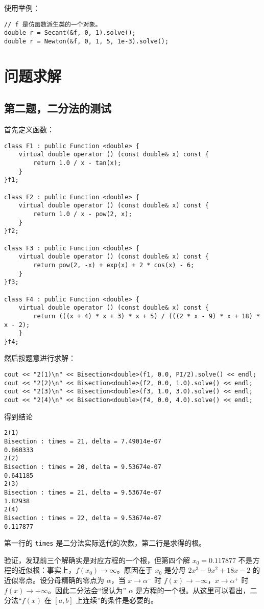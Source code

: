 \documentclass{ctexart}
\begin{document}
使用举例：
\begin{verbatim}
// f 是仿函数派生类的一个对象。
double r = Secant(&f, 0, 1).solve();
double r = Newton(&f, 0, 1, 5, 1e-3).solve();
\end{verbatim}

\section{问题求解}

\subsection{第二题，二分法的测试}
首先定义函数：
\begin{verbatim}
class F1 : public Function <double> {
    virtual double operator () (const double& x) const {
        return 1.0 / x - tan(x);
    }
}f1;

class F2 : public Function <double> {
    virtual double operator () (const double& x) const {
        return 1.0 / x - pow(2, x);
    }
}f2;

class F3 : public Function <double> {
    virtual double operator () (const double& x) const {
        return pow(2, -x) + exp(x) + 2 * cos(x) - 6;
    }
}f3;

class F4 : public Function <double> {
    virtual double operator () (const double& x) const {
        return (((x + 4) * x + 3) * x + 5) / (((2 * x - 9) * x + 18) * x - 2);
    }
}f4;
\end{verbatim}

然后按题意进行求解：
\begin{verbatim}
cout << "2(1)\n" << Bisection<double>(f1, 0.0, PI/2).solve() << endl;
cout << "2(2)\n" << Bisection<double>(f2, 0.0, 1.0).solve() << endl;
cout << "2(3)\n" << Bisection<double>(f3, 1.0, 3.0).solve() << endl;
cout << "2(4)\n" << Bisection<double>(f4, 0.0, 4.0).solve() << endl;
\end{verbatim}

得到结论
\begin{verbatim}
2(1)
Bisection : times = 21, delta = 7.49014e-07
0.860333
2(2)
Bisection : times = 20, delta = 9.53674e-07
0.641185
2(3)
Bisection : times = 21, delta = 9.53674e-07
1.82938
2(4)
Bisection : times = 22, delta = 9.53674e-07
0.117877
\end{verbatim}

第一行的 \verb|times| 是二分法实际迭代的次数，第二行是求得的根。

验证，发现前三个解确实是对应方程的一个根，但第四个解 $x_0=0.117877$ 不是方程的近似根：事实上，$f(x_0)\rightarrow \infty$。原因在于 $x_0$ 是分母 $2x^3-9x^2+18x-2$ 的近似零点。设分母精确的零点为 $\alpha$，当 $x\rightarrow \alpha^-$ 时 $f(x)\rightarrow -\infty$，$x\rightarrow \alpha^+$ 时 $f(x)\rightarrow +\infty$。因此二分法会“误认为” $\alpha$ 是方程的一个根。从这里可以看出，二分法“$f(x)$ 在 $[a,b]$ 上连续”的条件是必要的。
\end{document}
